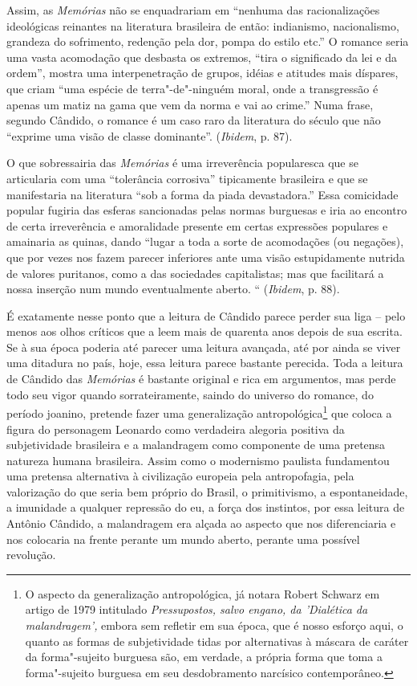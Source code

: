 Assim, as \emph{Memórias} não se enquadrariam em ``nenhuma das
racionalizações ideológicas reinantes na literatura brasileira de então:
indianismo, nacionalismo, grandeza do sofrimento, redenção pela dor,
pompa do estilo etc.'' O romance seria uma vasta acomodação que desbasta
os extremos, ``tira o significado da lei e da ordem'', mostra uma
interpenetração de grupos, idéias e atitudes mais díspares, que criam
``uma espécie de terra"-de"-ninguém moral, onde a transgressão é apenas um
matiz na gama que vem da norma e vai ao crime.'' Numa frase, segundo
Cândido, o romance é um caso raro da literatura do século  que não
``exprime uma visão de classe dominante''. (\emph{Ibidem}, p. 87).

O que sobressairia das \emph{Memórias} é uma irreverência popularesca
que se articularia com uma ``tolerância corrosiva'' tipicamente
brasileira e que se manifestaria na literatura ``sob a forma da piada
devastadora.'' Essa comicidade popular fugiria das esferas sancionadas
pelas normas burguesas e iria ao encontro de certa irreverência e
amoralidade presente em certas expressões populares e amainaria as
quinas, dando ``lugar a toda a sorte de acomodações (ou negações), que
por vezes nos fazem parecer inferiores ante uma visão estupidamente
nutrida de valores puritanos, como a das sociedades capitalistas; mas
que facilitará a nossa inserção num mundo eventualmente aberto. ``
(\emph{Ibidem}, p. 88).

É exatamente nesse ponto que a leitura de Cândido parece perder sua liga
-- pelo menos aos olhos críticos que a leem mais de quarenta anos depois
de sua escrita. Se à sua época poderia até parecer uma leitura avançada,
até por ainda se viver uma ditadura no país, hoje, essa leitura parece
bastante perecida. Toda a leitura de Cândido das \emph{Memórias} é
bastante original e rica em argumentos, mas perde todo seu vigor quando
sorrateiramente, saindo do universo do romance, do período joanino,
pretende fazer uma generalização antropológica\footnote{O aspecto da
  generalização antropológica, já notara Robert Schwarz em artigo de
  1979 intitulado \emph{Pressupostos, salvo engano, da 'Dialética da
  malandragem',} embora sem refletir em sua época, que é nosso esforço
  aqui, o quanto as formas de subjetividade tidas por alternativas à
  máscara de caráter da forma"-sujeito burguesa são, em verdade, a
  própria forma que toma a forma"-sujeito burguesa em seu desdobramento
  narcísico contemporâneo.} que coloca a figura do personagem Leonardo
como verdadeira alegoria positiva da subjetividade brasileira e a
malandragem como componente de uma pretensa natureza humana brasileira.
Assim como o modernismo paulista fundamentou uma pretensa alternativa à
civilização europeia pela antropofagia, pela valorização do que seria
bem próprio do Brasil, o primitivismo, a espontaneidade, a imunidade a
qualquer repressão do eu, a força dos instintos, por essa leitura de
Antônio Cândido, a malandragem era alçada ao aspecto que nos
diferenciaria e nos colocaria na frente perante um mundo aberto, perante
uma possível revolução.

